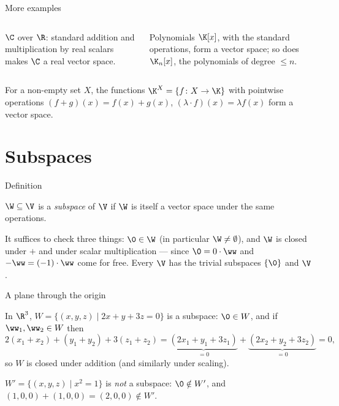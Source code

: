 \begin{frame}{More examples}
\begin{columns}
\column
\begin{example}
$\C$ over $\R$: standard addition and multiplication by real scalars makes $\C$ a real vector space.
\end{example}
\column
\begin{example}
Polynomials $\K[x]$, with the standard operations, form a vector space; so does $\K_n[x]$, the polynomials
of degree $\leq n$.
\end{example}
\end{columns}

\pause

\begin{example}
For a non-empty set $X$, the functions $\K^X = \{f\colon X\to\K\}$ with pointwise operations
$(f+g)(x)=f(x)+g(x)$, $(\lambda\cdot f)(x)=\lambda f(x)$ form a vector space.
\end{example}
\end{frame}

\section{Subspaces}

\begin{frame}{Definition}
\begin{definition}
$\W\subseteq\V$ is a \emph{subspace} of $\V$ if $\W$ is itself a vector space under the same operations.
\end{definition}

\pause

\begin{remark}[A shortcut]
It suffices to check three things: $\0\in\W$ (in particular $\W\neq\emptyset$), and $\W$ is closed under
$+$ and under scalar multiplication — since $\0=0\cdot\ww$ and $-\ww=(-1)\cdot\ww$ come for free. Every
$\V$ has the trivial subspaces $\{\0\}$ and $\V$.
\end{remark}
\end{frame}

\begin{frame}{A plane through the origin}
\begin{example}
In $\R^3$, $W=\{(x,y,z)\mid 2x+y+3z=0\}$ is a subspace: $\0\in W$, and if $\ww_1,\ww_2\in W$ then
\[
2(x_1+x_2)+(y_1+y_2)+3(z_1+z_2) = \underbrace{(2x_1+y_1+3z_1)}_{=0} + \underbrace{(2x_2+y_2+3z_2)}_{=0} = 0,
\]
so $W$ is closed under addition (and similarly under scaling).
\end{example}

\pause

\begin{warning}
$W' = \{(x,y,z)\mid x^2=1\}$ is \emph{not} a subspace: $\0\notin W'$, and $(1,0,0)+(1,0,0)=(2,0,0)\notin W'$.
\end{warning}
\end{frame}

